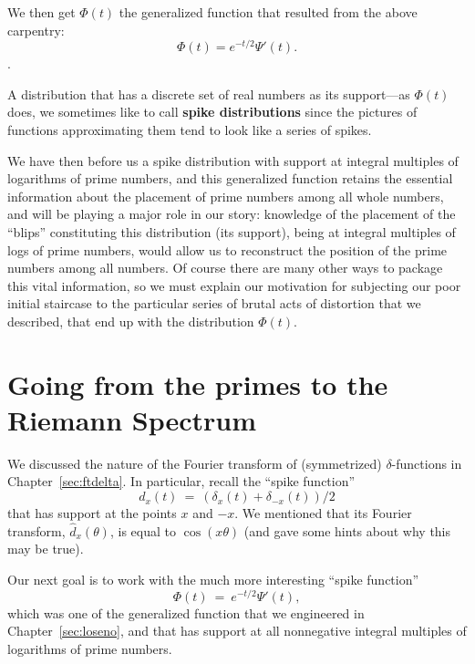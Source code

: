 \documentclass[openany]{book}
\theoremstyle{plain}
\theoremstyle{definition}
\newcommand{\todo}[1]{\par\vspace{1em}{\small---------\\{{\bf To be done:} #1}\\-----------}\par\vspace{1em}}
\begin{document}
{{{We then get $\Phi(t)$ the generalized function that resulted from the above carpentry:
  $$\Phi(t) = e^{-t/2}\Psi'(t). $$
}.%


A distribution that has a discrete set of real numbers as its
  support---as $\Phi(t)$ does, we sometimes like to call {\bf spike
    distributions} since the pictures of functions approximating them
  tend to look like a series of spikes.

  We have then before us a spike distribution with support at integral
  multiples of logarithms of prime numbers, and this generalized
  function retains the essential information about the placement of
  prime numbers among all whole numbers, and will be playing a major
  role in our story: knowledge of the placement of the ``blips'' constituting this distribution (its
support), being at  integral multiples of logs of prime numbers, would allow us to reconstruct the position of the prime
numbers among all numbers. Of course there are many other ways to package this vital information, so we
must explain our motivation for subjecting our poor initial staircase
to the particular series of brutal acts of distortion that we
described, that end up with the distribution $\Phi(t)$.







\chapter{Going from the primes to the Riemann Spectrum}
\label{ch:prime-to-spectrum}



We  discussed the nature of the Fourier transform of (symmetrized)
$\delta$-functions in Chapter~\ref{sec:ftdelta}. In particular, recall
the ``spike function'' $$d_x(t) \ = \ (\delta_x(t) +
\delta_{-x}(t))/2$$ that has support at the points $x$ and $-x$.  We
mentioned that its Fourier transform, ${\hat d}_x(\theta)$, is equal
to $\cos(x\theta)$ (and gave some hints about why this may be true).


Our next goal is to work with the much more interesting ``spike
function'' $$\Phi(t) \ = \ e^{- t/2}\Psi'(t),$$ which was one of the
generalized function that we engineered in Chapter~\ref{sec:loseno},
and that has support at all nonnegative integral multiples of
logarithms of prime numbers.




}}
\end{document}
